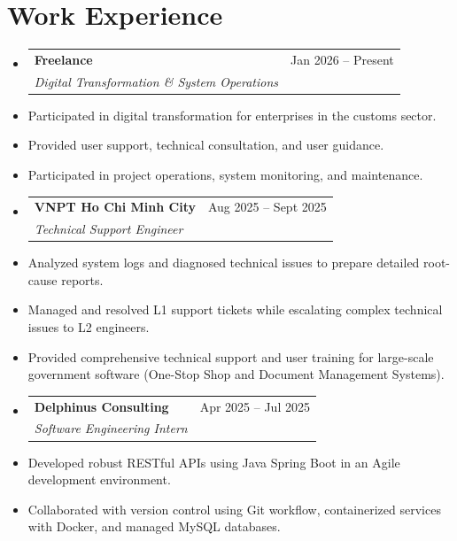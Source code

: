 \documentclass[a4paper,11pt]{article}
\makeatletter
\newcommand{\resumeItem}[1]{\item\small{#1}}
\newcommand{\resumeSubheading}[4]{
  \item
    \begin{tabular*}{0.97\textwidth}[t]{l@{\extracolsep{\fill}}r}
      \textbf{#1} & #2 \\
      \textit{#3} & \textit{#4} \\
    \end{tabular*}\vspace{-5pt}
}
\makeatother
\begin{document}
\section{Work Experience}
\begin{itemize}[leftmargin=0.15in, label={}]
    \resumeSubheading{Freelance}{Jan 2026 -- Present}{Digital Transformation \& System Operations}{}
    \resumeItem{Participated in digital transformation for enterprises in the customs sector.}
    \resumeItem{Provided user support, technical consultation, and user guidance.}
    \resumeItem{Participated in project operations, system monitoring, and maintenance.}

    \resumeSubheading{VNPT Ho Chi Minh City}{Aug 2025 -- Sept 2025}{Technical Support Engineer}{}
    \resumeItem{Analyzed system logs and diagnosed technical issues to prepare detailed root-cause reports.}
    \resumeItem{Managed and resolved L1 support tickets while escalating complex technical issues to L2 engineers.}
    \resumeItem{Provided comprehensive technical support and user training for large-scale government software (One-Stop Shop and Document Management Systems).}

    \resumeSubheading{Delphinus Consulting}{Apr 2025 -- Jul 2025}{Software Engineering Intern}{}
    \resumeItem{Developed robust RESTful APIs using Java Spring Boot in an Agile development environment.}
    \resumeItem{Collaborated with version control using Git workflow, containerized services with Docker, and managed MySQL databases.}
\end{itemize}

\end{document}
